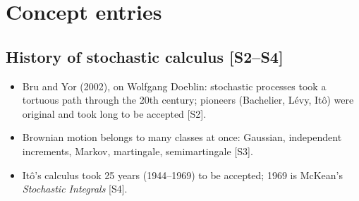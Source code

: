 \documentclass[10pt]{article}
\begin{document}
\section{Concept entries}

\subsection{History of stochastic calculus [S2--S4]}
\begin{itemize}
\item Bru and Yor (2002), on Wolfgang Doeblin: stochastic processes took a tortuous path through the 20th century; pioneers (Bachelier, L\'evy, It\^o) were original and took long to be accepted [S2].
\item Brownian motion belongs to many classes at once: Gaussian, independent increments, Markov, martingale, semimartingale [S3].
\item It\^o's calculus took 25 years (1944--1969) to be accepted; 1969 is McKean's \emph{Stochastic Integrals} [S4].
\end{itemize}
\end{document}
